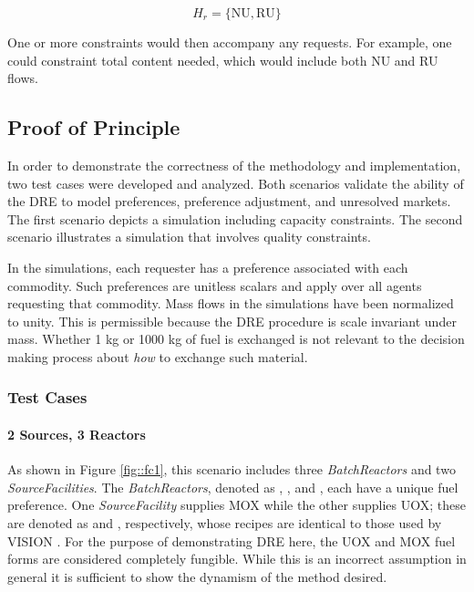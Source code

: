 \begin{equation}\label{eqs:enr-dem-commods}
  H_{r} = \{ \mbox{NU}, \mbox{RU} \}
\end{equation}

One or more constraints would then accompany any requests. For example, one
could constraint total  content needed, which would include both NU
and RU flows.

\subsection{Proof of Principle}\label{abm:dre:proof}

In order to demonstrate the correctness of the methodology and implementation,
two test cases were developed and analyzed. Both scenarios validate the ability
of the DRE to model preferences, preference adjustment, and unresolved
markets. The first scenario depicts a simulation including capacity
constraints. The second scenario illustrates a simulation that involves quality
constraints.

In the simulations, each requester has a preference associated with each
commodity. Such preferences are unitless scalars and apply over all agents
requesting that commodity. Mass flows in the simulations have been normalized to
unity. This is permissible because the DRE procedure is scale invariant under
mass. Whether 1 kg or 1000 kg of fuel is exchanged is not relevant to the
decision making process about \emph{how} to exchange such material.

\subsubsection{Test Cases}

\paragraph{2 Sources, 3 Reactors}

As shown in Figure \ref{fig::fc1}, this scenario includes
three \textit{BatchReactors} and
two \textit{SourceFacilities}. The \textit{BatchReactors}, denoted
as , , and , each have a unique fuel
preference. One \textit{SourceFacility} supplies MOX while the other supplies
UOX; these are denoted as \MOXSource{} and \UOXSource{}, respectively, whose
recipes are identical to those used by
VISION \cite{jacobson_verifiable_2010}. For the purpose of demonstrating DRE
here, the UOX and MOX fuel forms are considered completely fungible. While this
is an incorrect assumption in general it is sufficient to show the dynamism of
the method desired.

